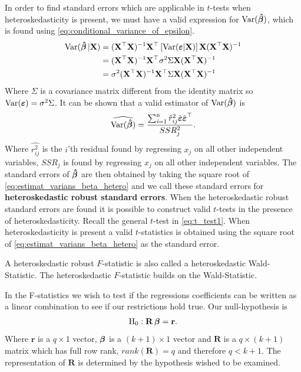 In order to find standard errors which are applicable in $t$-tests when heteroskedasticity is present, we must have a valid expression for $\operatorname{\text{Var}}(\operatorname{\boldsymbol{\hat{\beta}}})$, which is found using \eqref{eq:conditional_variance_of_epsilon}. 
\begin{align*}
   \operatorname{\text{Var}}(\operatorname{\boldsymbol{\hat{\beta}}}|\mathbf{X}) &= (\mathbf{X}^\top\mathbf{X})^{-1}\mathbf{X}^\top\left[ \operatorname{\text{Var}}(\boldsymbol{\varepsilon} | \mathbf{X}) \right] \mathbf{X}(\mathbf{X}^\top\mathbf{X})^{-1}\\
   &= (\mathbf{X}^\top \mathbf{X})^{-1}\mathbf{X}^\top \sigma^2 \Sigma \mathbf{X}(\mathbf{X}^\top \mathbf{X})^{-1}\\
   &= \sigma^2 (\mathbf{X}^\top \mathbf{X})^{-1}\mathbf{X}^\top \Sigma \mathbf{X} (\mathbf{X}^\top \mathbf{X})^{-1}
\end{align*}
Where $\Sigma$ is a covariance matrix different from the identity matrix so $\operatorname{\text{Var}}(\boldsymbol{\varepsilon}) = \sigma^2 \Sigma$. It can be shown that a valid estimator of $\operatorname{\text{Var}}(\operatorname{\boldsymbol{\hat{\beta}}})$ is
\begin{align}\label{eq:estimat_varians_beta_hetero}
    \widehat{\operatorname{\text{Var}}(\operatorname{\boldsymbol{\hat{\beta}}})} = \dfrac{\operatorname{\sum_{\textit{i}=1}^n} \hat{r}^2_{ij} \hat{\boldsymbol{\varepsilon}}\hat{\boldsymbol{\varepsilon}}^\top}{SSR_j^2}. 
\end{align}
Where $\hat{r^2_{ij}}$ is the $i$'th residual found by regressing $x_j$ on all other independent variables, $SSR_j$ is found by regressing $x_j$ on all other independent variables. 
The standard errors of $\operatorname{\boldsymbol{\hat{\beta}}}$ are then obtained by taking the square root of \eqref{eq:estimat_varians_beta_hetero} and we call these standard errors for \textbf{heteroskedastic robust standard errors}. When the heteroskedastic robust standard errors are found it is possible to construct valid $t$-tests in the presence of heteroskedasticity. 
Recall the general $t$-test in \eqref{eq:t_test1}. When heteroskedasticity is present a valid $t$-statistics is obtained using the square root of \eqref{eq:estimat_varians_beta_hetero} as the standard error. 

A heteroskedastic robust $F$-statistic is also called a heteroskedastic Wald-Statistic. The heteroskedastic $F$-statistic builds on the Wald-Statistic. 

In the F-statistics we wish to test if the regressions coefficients can be written as a linear combination to see if our restrictions hold true. Our null-hypothesis is
\begin{align*}
    \mathrm{H}_0 : \mathbf{R}\operatorname{\boldsymbol{\beta}} = \mathbf{r}. 
\end{align*}
Where $\mathbf{r}$ is a $q \times 1$ vector, $\operatorname{\boldsymbol{\beta}}$ is a $(k+1) \times 1$ vector and $\mathbf{R}$ is a $q \times (k+1)$ matrix which has full row rank, $rank(\mathbf{R}) = q$ and therefore $q < k+1$. The representation of $\mathbf{R}$ is determined by the hypothesis wished to be examined. 

